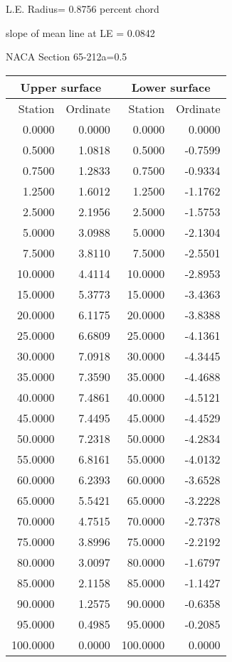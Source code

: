 \documentclass[11pt]{book}
\begin{document}
L.E. Radius=  0.8756 percent chord


 slope of mean line at LE =  0.0842
 \newpage
  \label{s65-212a=0.5}
 \begin{Large}
 NACA Section 65-212a=0.5
 \end{Large}
  
 \vspace{8mm}
 \begin{tabular}{|r|r|r|r|} \hline 
 \multicolumn{2}{|c|}{Upper surface} & \multicolumn{2}{|c|}{Lower surface} \\
 \hline
 Station & Ordinate & Station & Ordinate \\
 \hline
0.0000 & 0.0000 & 0.0000 & 0.0000 \\
0.5000 & 1.0818 & 0.5000 & -0.7599 \\
0.7500 & 1.2833 & 0.7500 & -0.9334 \\
1.2500 & 1.6012 & 1.2500 & -1.1762 \\
2.5000 & 2.1956 & 2.5000 & -1.5753 \\
5.0000 & 3.0988 & 5.0000 & -2.1304 \\
7.5000 & 3.8110 & 7.5000 & -2.5501 \\
10.0000 & 4.4114 & 10.0000 & -2.8953 \\
15.0000 & 5.3773 & 15.0000 & -3.4363 \\
20.0000 & 6.1175 & 20.0000 & -3.8388 \\
25.0000 & 6.6809 & 25.0000 & -4.1361 \\
30.0000 & 7.0918 & 30.0000 & -4.3445 \\
35.0000 & 7.3590 & 35.0000 & -4.4688 \\
40.0000 & 7.4861 & 40.0000 & -4.5121 \\
45.0000 & 7.4495 & 45.0000 & -4.4529 \\
50.0000 & 7.2318 & 50.0000 & -4.2834 \\
55.0000 & 6.8161 & 55.0000 & -4.0132 \\
60.0000 & 6.2393 & 60.0000 & -3.6528 \\
65.0000 & 5.5421 & 65.0000 & -3.2228 \\
70.0000 & 4.7515 & 70.0000 & -2.7378 \\
75.0000 & 3.8996 & 75.0000 & -2.2192 \\
80.0000 & 3.0097 & 80.0000 & -1.6797 \\
85.0000 & 2.1158 & 85.0000 & -1.1427 \\
90.0000 & 1.2575 & 90.0000 & -0.6358 \\
95.0000 & 0.4985 & 95.0000 & -0.2085 \\
100.0000 & 0.0000 & 100.0000 & 0.0000 \\
 \hline 
 \end{tabular}
\end{document}
